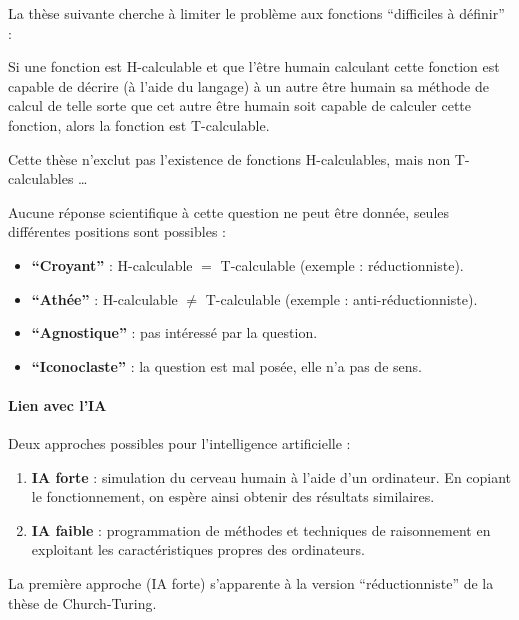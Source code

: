 La thèse suivante cherche à limiter le problème aux fonctions ``difficiles à définir'' :
\begin{mythese}
Si une fonction est H-calculable et que l'être humain calculant cette fonction est capable de décrire (à l'aide du langage) à un autre être humain sa méthode de calcul de telle sorte que cet autre être humain soit capable de calculer cette fonction, alors la fonction est T-calculable.
\end{mythese}

\begin{myrem}
Cette thèse n'exclut pas l'existence de fonctions H-calculables, mais non T-calculables \dots
\end{myrem}

Aucune réponse scientifique à cette question ne peut être donnée, seules différentes positions sont possibles :
\begin{itemize}
	\item \textbf{``Croyant''} : H-calculable $=$ T-calculable (exemple : réductionniste).
	\item \textbf{``Athée''} : H-calculable $\neq$ T-calculable (exemple : anti-réductionniste).
	\item \textbf{``Agnostique''} : pas intéressé par la question.
	\item \textbf{``Iconoclaste''} : la question est mal posée, elle n'a pas de sens.
\end{itemize}

\paragraph{Lien avec l'IA}
Deux approches possibles pour l'intelligence artificielle :
\begin{enumerate}
	\item \textbf{IA forte} : simulation du cerveau humain à l'aide d'un ordinateur. En copiant le fonctionnement, on espère ainsi obtenir des résultats similaires.
	\item \textbf{IA faible} : programmation de méthodes et techniques de raisonnement en exploitant les caractéristiques propres des ordinateurs.
\end{enumerate}
La première approche (IA forte) s'apparente à la version ``réductionniste'' de la thèse de Church-Turing.


